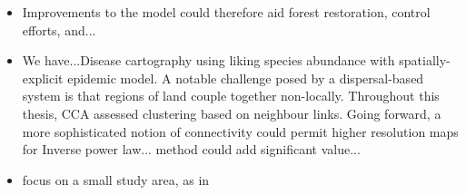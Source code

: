 \begin{itemize}
    \item Improvements to the model could therefore aid forest restoration, control efforts, and...
    \item We have...Disease cartography using liking species abundance with spatially-explicit epidemic model. A notable challenge posed by a dispersal-based system
    is that regions of land couple together non-locally. Throughout this thesis, CCA assessed clustering based on neighbour links. 
    Going forward, a more sophisticated notion of connectivity could permit higher resolution maps for Inverse power law... method could add significant value... 
    \item focus on a small study area, as in \cite{he2019integrating}
\end{itemize}






